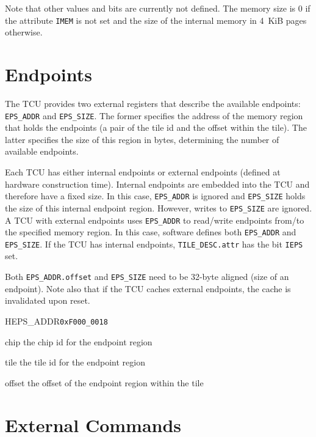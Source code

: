 \noindent Note that other values and bits are currently not defined. The memory size is 0 if the
attribute \texttt{IMEM} is not set and the size of the internal memory in 4~KiB pages otherwise.

\section{Endpoints}

The TCU provides two external registers that describe the available endpoints: \texttt{EPS\_ADDR}
and \texttt{EPS\_SIZE}. The former specifies the address of the memory region that holds the
endpoints (a pair of the tile id and the offset within the tile). The latter specifies the size of
this region in bytes, determining the number of available endpoints.

Each TCU has either internal endpoints or external endpoints (defined at hardware construction
time). Internal endpoints are embedded into the TCU and therefore have a fixed size. In this case,
\texttt{EPS\_ADDR} is ignored and \texttt{EPS\_SIZE} holds the size of this internal endpoint
region. However, writes to \texttt{EPS\_SIZE} are ignored. A TCU with external endpoints uses
\texttt{EPS\_ADDR} to read/write endpoints from/to the specified memory region. In this case,
software defines both \texttt{EPS\_ADDR} and \texttt{EPS\_SIZE}. If the TCU has internal endpoints,
\texttt{TILE\_DESC.attr} has the bit \texttt{IEPS} set.

Both \texttt{EPS\_ADDR.offset} and \texttt{EPS\_SIZE} need to be 32-byte aligned (size of an
endpoint). Note also that if the TCU caches external endpoints, the cache is invalidated upon reset.

\begin{register}{H}{EPS\_ADDR}{\texttt{0xF000\_0018}}
  \regnewline%
  \begin{regdesc}\begin{reglist}
    \item[chip] the chip id for the endpoint region
    \item[tile] the tile id for the endpoint region
    \item[offset] the offset of the endpoint region within the tile
  \end{reglist}\end{regdesc}
\end{register}

\section{External Commands}

